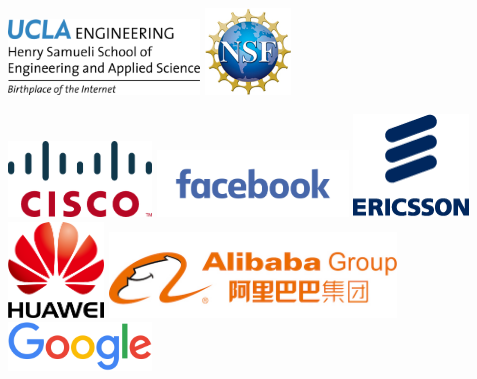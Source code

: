 \documentclass[sigconf]{acmart}
\begin{document}
\begin{center}

\includegraphics[width=2in]{ucla-hsseas.jpg}
\hspace{1in}
\includegraphics[width=0.9in]{nsf.jpg}

\hspace{0.2in}
\includegraphics[width=1.5in]{cisco.png}
\hspace{0.2in}
\includegraphics[width=2in]{facebook.png}
\hspace{0.2in}
\includegraphics[width=1.2in]{ericsson.png}
\\[0.5cm]

\hspace{0.2in}
\includegraphics[width=1in]{huawei.png}
\hspace{0.2in}
\includegraphics[width=3in]{alibaba.jpg}
\hspace{0.2in}
\includegraphics[width=1.5in]{google.png}
\\[0.8cm]


\end{center}
\end{document}

